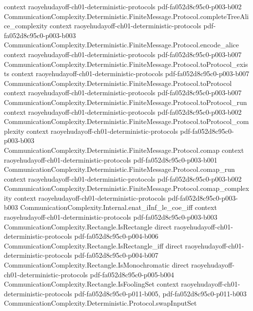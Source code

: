 \begin{theorem}
  {context}
  {raoyehudayoff-ch01-deterministic-protocols}
  {pdf-fa052d8c95c0-p003-b002}
\proofstep
  {CommunicationComplexity.Deterministic.FiniteMessage.Protocol.completeTreeAlice_complexity}
  {context}
  {raoyehudayoff-ch01-deterministic-protocols}
  {pdf-fa052d8c95c0-p003-b003}
\proofstep
  {CommunicationComplexity.Deterministic.FiniteMessage.Protocol.encode_alice}
  {context}
  {raoyehudayoff-ch01-deterministic-protocols}
  {pdf-fa052d8c95c0-p003-b007}
\proofstep
  {CommunicationComplexity.Deterministic.FiniteMessage.Protocol.toProtocol_exists}
  {context}
  {raoyehudayoff-ch01-deterministic-protocols}
  {pdf-fa052d8c95c0-p003-b007}
\proofstep
  {CommunicationComplexity.Deterministic.FiniteMessage.Protocol.toProtocol}
  {context}
  {raoyehudayoff-ch01-deterministic-protocols}
  {pdf-fa052d8c95c0-p003-b007}
\proofstep
  {CommunicationComplexity.Deterministic.FiniteMessage.Protocol.toProtocol_run}
  {context}
  {raoyehudayoff-ch01-deterministic-protocols}
  {pdf-fa052d8c95c0-p003-b002}
\proofstep
  {CommunicationComplexity.Deterministic.FiniteMessage.Protocol.toProtocol_complexity}
  {context}
  {raoyehudayoff-ch01-deterministic-protocols}
  {pdf-fa052d8c95c0-p003-b003}
\proofstep
  {CommunicationComplexity.Deterministic.FiniteMessage.Protocol.comap}
  {context}
  {raoyehudayoff-ch01-deterministic-protocols}
  {pdf-fa052d8c95c0-p003-b001}
\proofstep
  {CommunicationComplexity.Deterministic.FiniteMessage.Protocol.comap_run}
  {context}
  {raoyehudayoff-ch01-deterministic-protocols}
  {pdf-fa052d8c95c0-p003-b002}
\proofstep
  {CommunicationComplexity.Deterministic.FiniteMessage.Protocol.comap_complexity}
  {context}
  {raoyehudayoff-ch01-deterministic-protocols}
  {pdf-fa052d8c95c0-p003-b003}
\proofstep
  {CommunicationComplexity.Internal.enat_iInf_le_coe_iff}
  {context}
  {raoyehudayoff-ch01-deterministic-protocols}
  {pdf-fa052d8c95c0-p003-b003}
\proofstep
  {CommunicationComplexity.Rectangle.IsRectangle}
  {direct}
  {raoyehudayoff-ch01-deterministic-protocols}
  {pdf-fa052d8c95c0-p004-b006}
\proofstep
  {CommunicationComplexity.Rectangle.IsRectangle_iff}
  {direct}
  {raoyehudayoff-ch01-deterministic-protocols}
  {pdf-fa052d8c95c0-p004-b007}
\proofstep
  {CommunicationComplexity.Rectangle.IsMonochromatic}
  {direct}
  {raoyehudayoff-ch01-deterministic-protocols}
  {pdf-fa052d8c95c0-p005-b004}
\proofstep
  {CommunicationComplexity.Rectangle.IsFoolingSet}
  {context}
  {raoyehudayoff-ch01-deterministic-protocols}
  {pdf-fa052d8c95c0-p011-b005,
    pdf-fa052d8c95c0-p011-b003}
\proofstep
  {CommunicationComplexity.Deterministic.Protocol.swapInputSet}

\end{theorem}
